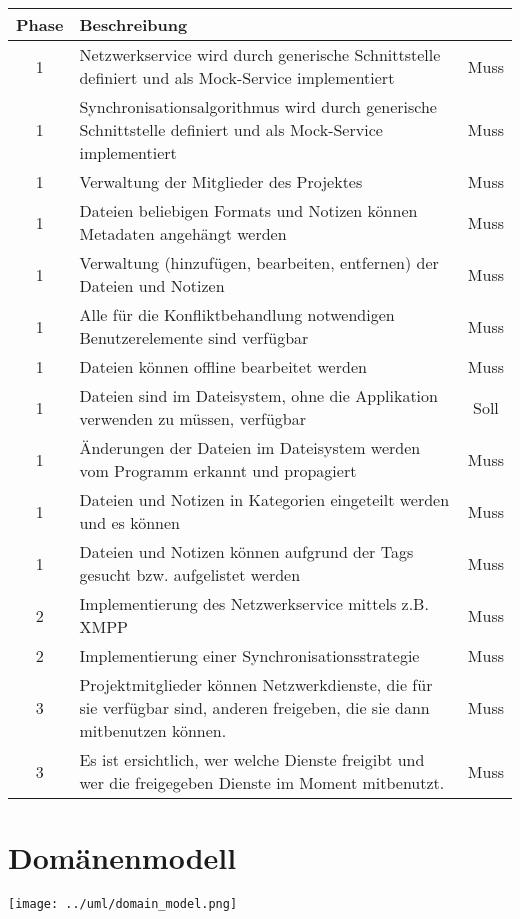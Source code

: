 \begin{tabular}{ | c | p{10.5cm} | c |}
\hline
\textbf{Phase} & \textbf{Beschreibung} & \textbf{}\\
\hline
1 & Netzwerkservice wird durch generische Schnittstelle definiert und als Mock-Service implementiert & Muss\\
\hline
1 & Synchronisationsalgorithmus wird durch generische Schnittstelle definiert und als Mock-Service implementiert & Muss\\
\hline
1 & Verwaltung der Mitglieder des Projektes & Muss\\
\hline
1 & Dateien beliebigen Formats und Notizen können Metadaten angehängt werden & Muss\\
\hline
1 & Verwaltung (hinzufügen, bearbeiten, entfernen) der Dateien und Notizen & Muss\\
\hline
1 & Alle für die Konfliktbehandlung notwendigen Benutzerelemente sind verfügbar & Muss\\
\hline
1 & Dateien können offline bearbeitet werden & Muss\\
\hline
1 & Dateien sind im Dateisystem, ohne die Applikation verwenden zu müssen, verfügbar & Soll\\
\hline
1 & Änderungen der Dateien im Dateisystem werden vom Programm erkannt und propagiert & Muss\\
\hline
1 & Dateien und Notizen in Kategorien eingeteilt werden und es können & Muss\\
\hline
1 & Dateien und Notizen können aufgrund der Tags gesucht bzw. aufgelistet werden & Muss\\
\hline
2 & Implementierung des Netzwerkservice mittels z.B. XMPP & Muss\\
\hline
2 & Implementierung einer Synchronisationsstrategie & Muss\\
\hline
3 & Projektmitglieder können Netzwerkdienste, die für sie verfügbar sind, anderen freigeben, die sie dann mitbenutzen können. & Muss\\
\hline
3 & Es ist ersichtlich, wer welche Dienste freigibt und wer die freigegeben Dienste im Moment mitbenutzt. & Muss\\
\hline
\end{tabular}

\section{Domänenmodell}
\texttt{[image: ../uml/domain\_model.png]}
